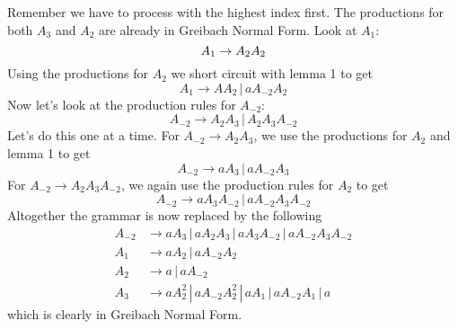 Remember we have to process with the highest index first. The
productions for both $A_3$ and $A_2$ are already in Greibach
Normal Form. Look at $A_1$:
\[
 A_1 \rightarrow A_2A_2 \\
\]
Using the productions for $A_2$ we short circuit with lemma 1 to
get
\[
 A_1 \rightarrow A A_2 \,|\, a A_{-2} A_2
\]
Now let's look at the production rules for $A_{-2}$:
\[
 A_{-2} \rightarrow A_2 A_3 \,|\, A_2 A_3 A_{-2}
\]
Let's do this one at a time. For $A_{-2} \rightarrow A_2 A_3$, we
use the productions for $A_2$ and lemma 1 to get
\[
 A_{-2} \rightarrow aA_3 \,|\, aA_{-2} A_3
\]
For $A_{-2} \rightarrow A_2 A_3 A_{-2}$, we again use the
production rules for $A_2$ to get
\[
 A_{-2} \rightarrow a A_3 A_{-2} \,|\, a A_{-2} A_3 A_{-2}
\]
Altogether the grammar is now replaced by the following
\begin{align*}
 A_{-2} &\rightarrow a A_3 \,|\, a A_2 A_3 \,|\, a A_3 A_{-2} \,|\,
 a A_{-2} A_3 A_{-2} \\
 A_1 &\rightarrow a A_2 \,|\, a A_{-2} A_2 \\
 A_2 &\rightarrow a \,|\, a A_{-2} \\
 A_3 &\rightarrow aA_2^2 \,|\, a A_{-2} A_2^2 \,|\, a A_1 \,|\, a
 A_{-2} A_1 \,|\, a
\end{align*}
which is clearly in Greibach Normal Form.
